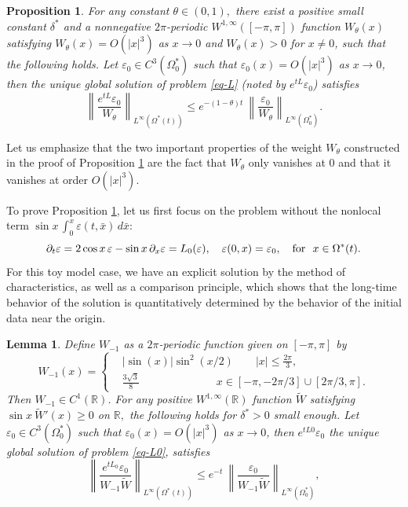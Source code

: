 \documentclass[12pt]{amsart}
\numberwithin{equation}{section}
\let\veps=\varepsilon
\def\R{{\mathbb R}}
\numberwithin{equation}{section}
\newtheorem{lem}[thm]{Lemma}
\newtheorem{prop}[thm]{Proposition}
\begin{document}
\begin{prop}\label{Prop2.1}
 For any   constant $\theta\in (0, 1),$   there exist a  positive small constant  $\delta^*$  and   a nonnegative $2\pi$-periodic $W^{1, \infty}([-\pi, \pi])$  function  $W_\theta(x)$ satisfying $W_\theta(x)=O(|x|^3)$ as $x\to 0$ and $W_\theta(x)>0$ for $x\neq 0$, such that the following holds.  Let $\veps_0\in C^{3}(\Omega^*_0)$ such that $\veps_0(x)=O(|x|^3)$ as $x\to 0$, then the unique global solution of problem \eqref{eq-L} (noted by $e^{tL}\veps_0$)  satisfies
\begin{equation}\label{eq-2.00}
\left\|\frac{e^{tL} \veps_0}{W_\theta }\right\|_{L^\infty{(\Omega^*(t))}}\leq  e^{-(1-\theta)t}~
 \left\|\frac{\veps_0}{W_\theta }\right\|_{L^\infty{(\Omega^*_0)}}.
\end{equation}
\end{prop}

 {Let us emphasize that the two important properties of the weight $W_\theta$ constructed in the proof of Proposition \ref{Prop2.1} are the fact that $W_\theta$ only vanishes at $0$ and that it vanishes at order $O(|x|^3)$.}

To prove Proposition \ref{Prop2.1}, let us first focus on the problem without the nonlocal term $\sin x\, \int_0^x \veps(t, \bar x)\,d\bar x:$ 
\begin{equation}\label{eq-L0}
\partial_t \veps = 2 \cos x \,\veps-\sin x\, \partial_x \veps=L_0 (\veps), \quad \veps(0, x)=\veps_0,\quad {\rm for}~~x\in \Omega^*(t).
 \end{equation}
For this toy model case, we have an explicit solution by the method of characteristics, as well as a comparison principle, which shows that the long-time behavior of the solution is quantitatively determined by the behavior of the initial data near the origin. 
 
 \begin{lem}\label{Le-2.2}
 Define $W_{-1}$ as a $2\pi$-periodic function given on $[-\pi, \pi]$ by 
\begin{equation}
{W}_{-1} (x)=\left\{\begin{aligned}
 &|\sin(x) |\sin^2(x/2)\qquad |x|\leq \frac{2\pi}{3},\\
 &\frac{3\sqrt{3}}{8}\qquad\qquad\qquad \quad  x\in [-\pi, - {2\pi}/{3}]\cup [{2\pi}/{3},  \pi].
 \end{aligned}\right.
\end{equation}
Then $W_{-1}\in C^1(\mathbb R)$. For any positive  $W^{1, \infty}(\R)$  function $\widetilde W$ satisfying $\sin x ~{\widetilde W}'(x)\geq 0$ on $\R,$ the 
following holds for $\delta^*>0$ small enough. Let $\veps_0\in  C^{3}(\Omega^*_0)$ such that $\veps_0(x)=O(|x|^{3})$ as $x\to 0$, then $e^{tL0}\veps_0$ the unique global solution of problem \eqref{eq-L0}, satisfies 
\begin{equation}\label{Le2.2-2}
\left\|\frac{e^{tL_0} \veps_0}{W_{-1} \widetilde W}\right\|_{L^\infty{(\Omega^*(t))}}\leq  e^{-t}~
 \left\|\frac{\veps_0}{W_{-1}\widetilde W}\right\|_{L^\infty{(\Omega^*_0)}},\end{equation}
  \end{lem}
  
\end{document}
